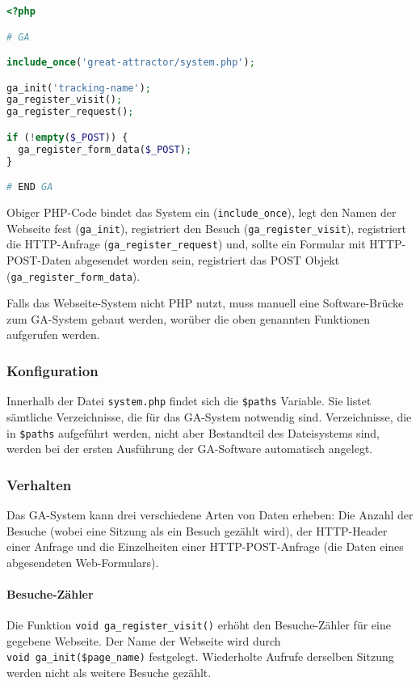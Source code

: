 \begin{lstlisting}[language=PHP]
<?php

# GA

include_once('great-attractor/system.php');

ga_init('tracking-name');
ga_register_visit();
ga_register_request();

if (!empty($_POST)) {
  ga_register_form_data($_POST);
}

# END GA
\end{lstlisting}

Obiger PHP-Code bindet das System ein (\texttt{include\_once}), legt den
Namen der Webseite fest (\texttt{ga\_init}), registriert den Besuch
(\texttt{ga\_register\_visit}), registriert die HTTP-Anfrage
(\texttt{ga\_register\_request}) und, sollte ein Formular mit
HTTP-POST-Daten abgesendet worden sein, registriert das POST Objekt
(\texttt{ga\_register\_form\_data}).

Falls das Webseite-System nicht PHP nutzt, muss manuell eine
Software-Brücke zum GA-System gebaut werden, worüber die oben genannten
Funktionen aufgerufen werden.

\subsubsection{Konfiguration} %
\label{ssub:ga_konfiguration}
Innerhalb der Datei \texttt{system.php} findet sich die \texttt{\$paths}
Variable. Sie listet sämtliche Verzeichnisse, die für das GA-System
notwendig sind. Verzeichnisse, die in \texttt{\$paths} aufgeführt
werden, nicht aber Bestandteil des Dateisystems sind, werden bei der
ersten Ausführung der GA-Software automatisch angelegt.

\subsubsection{Verhalten} %
\label{ssub:verhalten}
Das GA-System kann drei verschiedene Arten von Daten erheben: Die Anzahl
der Besuche (wobei eine Sitzung als ein Besuch gezählt wird), der
HTTP-Header einer Anfrage und die Einzelheiten einer HTTP-POST-Anfrage
(die Daten eines abgesendeten Web-Formulars).

\paragraph{Besuche-Zähler} %
\label{par:ga_besuche_zahler}
Die Funktion \texttt{void\ ga\_register\_visit()} erhöht den
Besuche-Zähler für eine gegebene Webseite. Der Name der Webseite wird
durch \texttt{void\ ga\_init(\$page\_name)} festgelegt. Wiederholte
Aufrufe derselben Sitzung werden nicht als weitere Besuche gezählt.

